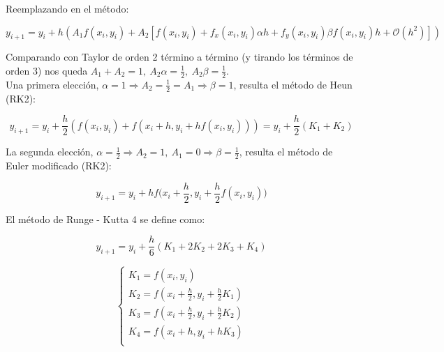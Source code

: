 Reemplazando en el m\'etodo:

$$y_{i + 1} = y_{i} + h(A_{1}f(x_{i}, y_{i}) + A_{2}[f(x_{i}, y_{i}) + f_{x}(x_{i}, y_{i})\alpha h + f_{y}(x_{i}, y_{i})\beta f(x_{i}, y_{i})h + \mathcal{O}(h^{2})])$$

Comparando con Taylor de orden 2 t\'ermino a t\'ermino (y tirando los t\'erminos de orden 3) nos queda $A_{1} + A_{2} = 1,\ A_{2}\alpha = \frac{1}{2},\ A_{2}\beta = \frac{1}{2}$.\\

Una primera elecci\'on, $\alpha = 1 \Rightarrow A_{2} = \frac{1}{2} = A_{1} \Rightarrow \beta = 1$, resulta el m\'etodo de Heun (RK2):

$$y_{i + 1} = y_{i} + \frac{h}{2}(f(x_{i}, y_{i}) + f(x_{i} + h, y_{i} + hf(x_{i}, y_{i}))) = y_{i} + \frac{h}{2}(K_{1} + K_{2})$$

La segunda elecci\'on, $\alpha = \frac{1}{2} \Rightarrow A_{2} = 1,\ A_{1} = 0 \Rightarrow \beta = \frac{1}{2}$, resulta el m\'etodo de Euler modificado (RK2):

$$y_{i + 1} = y_{i} + hf\bigg(x_{i} + \frac{h}{2}, y_{i} + \frac{h}{2}f(x_{i}, y_{i})\bigg)$$

El m\'etodo de Runge - Kutta 4 se define como:

$$y_{i + 1} = y_{i} + \frac{h}{6}(K_{1} + 2K_{2} + 2K_{3} + K_{4})$$

$$ 
	\begin{cases}
        K_{1} = f(x_{i}, y_{i})\\
        K_{2} = f(x_{i} + \frac{h}{2}, y_{i} + \frac{h}{2}K_{1})\\
        K_{3} = f(x_{i} + \frac{h}{2}, y_{i} + \frac{h}{2}K_{2})\\
        K_{4} = f(x_{i} + h, y_{i} + hK_{3})\\
    \end{cases}
$$